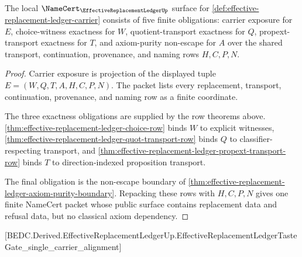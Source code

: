 \begin{theorem}
\label{thm:effective-replacement-ledger-namecert-obligations}
The local $\NameCert_{\EffectiveReplacementLedgerUp}$ surface for \autoref{def:effective-replacement-ledger-carrier} consists of five finite obligations: carrier exposure for $E$, choice-witness exactness for $W$, quotient-transport exactness for $Q$, propext-transport exactness for $T$, and axiom-purity non-escape for $A$ over the shared transport, continuation, provenance, and naming rows $H,C,P,N$.
\end{theorem}
\begin{proof}
Carrier exposure is projection of the displayed tuple $E=(W,Q,T,A,H,C,P,N)$. The packet lists every replacement, transport, continuation, provenance, and naming row as a finite coordinate.

The three exactness obligations are supplied by the row theorems above. \autoref{thm:effective-replacement-ledger-choice-row} binds $W$ to explicit witnesses, \autoref{thm:effective-replacement-ledger-quot-transport-row} binds $Q$ to classifier-respecting transport, and \autoref{thm:effective-replacement-ledger-propext-transport-row} binds $T$ to direction-indexed proposition transport.

The final obligation is the non-escape boundary of \autoref{thm:effective-replacement-ledger-axiom-purity-boundary}. Repacking these rows with $H,C,P,N$ gives one finite NameCert packet whose public surface contains replacement data and refusal data, but no classical axiom dependency.
\end{proof}

[BEDC.Derived.EffectiveReplacementLedgerUp.EffectiveReplacementLedgerTasteGate\_single\_carrier\_alignment]

